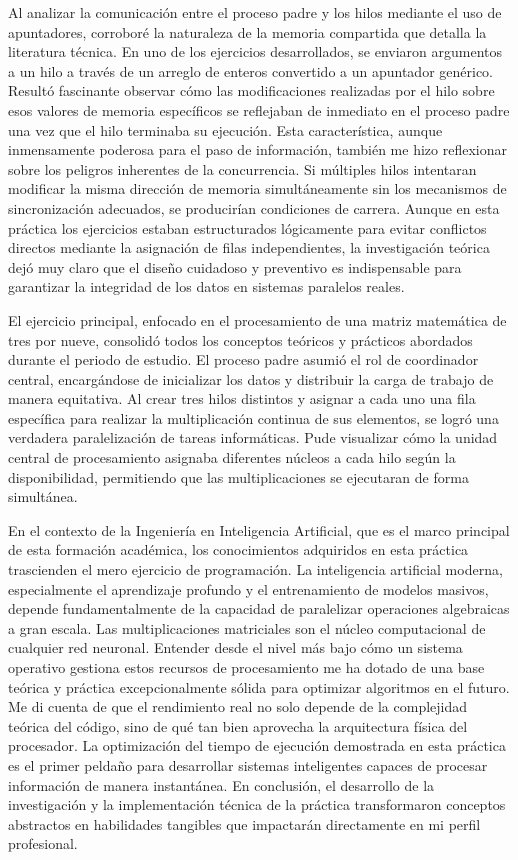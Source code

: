 Al analizar la comunicación entre el proceso padre y los hilos mediante el uso de apuntadores, corroboré la naturaleza de la memoria compartida que detalla la literatura técnica. En uno de los ejercicios desarrollados, se enviaron argumentos a un hilo a través de un arreglo de enteros convertido a un apuntador genérico. Resultó fascinante observar cómo las modificaciones realizadas por el hilo sobre esos valores de memoria específicos se reflejaban de inmediato en el proceso padre una vez que el hilo terminaba su ejecución. Esta característica, aunque inmensamente poderosa para el paso de información, también me hizo reflexionar sobre los peligros inherentes de la concurrencia. Si múltiples hilos intentaran modificar la misma dirección de memoria simultáneamente sin los mecanismos de sincronización adecuados, se producirían condiciones de carrera. Aunque en esta práctica los ejercicios estaban estructurados lógicamente para evitar conflictos directos mediante la asignación de filas independientes, la investigación teórica dejó muy claro que el diseño cuidadoso y preventivo es indispensable para garantizar la integridad de los datos en sistemas paralelos reales.

El ejercicio principal, enfocado en el procesamiento de una matriz matemática de tres por nueve, consolidó todos los conceptos teóricos y prácticos abordados durante el periodo de estudio. El proceso padre asumió el rol de coordinador central, encargándose de inicializar los datos y distribuir la carga de trabajo de manera equitativa. Al crear tres hilos distintos y asignar a cada uno una fila específica para realizar la multiplicación continua de sus elementos, se logró una verdadera paralelización de tareas informáticas. Pude visualizar cómo la unidad central de procesamiento asignaba diferentes núcleos a cada hilo según la disponibilidad, permitiendo que las multiplicaciones se ejecutaran de forma simultánea.

En el contexto de la Ingeniería en Inteligencia Artificial, que es el marco principal de esta formación académica, los conocimientos adquiridos en esta práctica trascienden el mero ejercicio de programación. La inteligencia artificial moderna, especialmente el aprendizaje profundo y el entrenamiento de modelos masivos, depende fundamentalmente de la capacidad de paralelizar operaciones algebraicas a gran escala. Las multiplicaciones matriciales son el núcleo computacional de cualquier red neuronal. Entender desde el nivel más bajo cómo un sistema operativo gestiona estos recursos de procesamiento me ha dotado de una base teórica y práctica excepcionalmente sólida para optimizar algoritmos en el futuro. Me di cuenta de que el rendimiento real no solo depende de la complejidad teórica del código, sino de qué tan bien aprovecha la arquitectura física del procesador. La optimización del tiempo de ejecución demostrada en esta práctica es el primer peldaño para desarrollar sistemas inteligentes capaces de procesar información de manera instantánea. En conclusión, el desarrollo de la investigación y la implementación técnica de la práctica transformaron conceptos abstractos en habilidades tangibles que impactarán directamente en mi perfil profesional.

